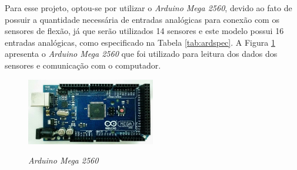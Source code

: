 Para esse projeto, optou-se por utilizar o \textit{Arduino Mega 2560}, devido ao fato de possuir a quantidade necessária de entradas analógicas para conexão com os sensores de flexão, já que serão utilizados 14 sensores e este modelo possui 16 entradas analógicas, como especificado na Tabela \ref{tab:ardspec}. A Figura \ref{fig:arduino} apresenta o \textit{Arduino Mega 2560} que foi utilizado para leitura dos dados dos sensores e comunicação com o computador.

\begin{figure}[H]
  \setlength{\abovecaptionskip}{0pt}
  \setlength{\belowcaptionskip}{0pt}
  \caption[\textit{Arduino Mega 2560}]{\textit{Arduino Mega 2560}}
  \centering
  \includegraphics[width=0.5\textwidth]{imagem/ArduinoMega2560R3}
  \captionsetup{justification=centering}
  \label{fig:arduino}
\end{figure}

